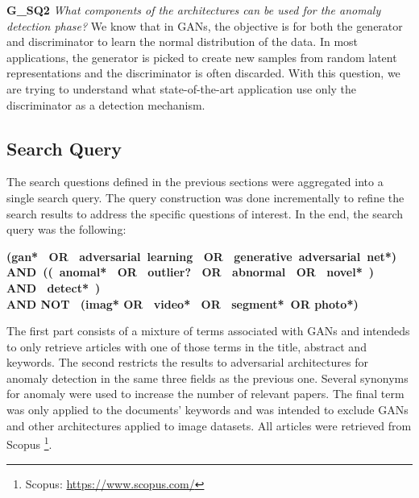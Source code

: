 \noindent\textbf{G\_SQ2} \textit{What components of the architectures can be used for the anomaly detection phase?} We know that in GANs, the objective is for both the generator and discriminator to learn the normal distribution of the data. In most applications, the generator is picked to create new samples from random latent representations and the discriminator is often discarded. With this question, we are trying to understand what state-of-the-art application use only the discriminator as a detection mechanism.

\subsection{Search Query}\label{sec:gan_search_queries}
The search questions defined in the previous sections were aggregated into a single search query. The query construction was done incrementally to refine the search results to address the specific questions of interest. In the end, the search query was the following:
\begin{center}
\textbf{(gan*  OR  adversarial learning  OR  generative adversarial net*) \\ AND (( anomal*  OR  outlier?  OR  abnormal  OR  novel* )  AND  detect* ) \\ AND NOT  (imag* OR  video*  OR  segment* OR photo*)}
\end{center}

The first part consists of a mixture of terms associated with GANs and intendeds to only retrieve articles with one of those terms in the title, abstract and keywords. The second restricts the results to adversarial architectures for anomaly detection in the same three fields as the previous one. Several synonyms for anomaly were used to increase the number of relevant papers. The final term was only applied to the documents' keywords and was intended to exclude GANs and other architectures applied to image datasets. All articles were retrieved from Scopus \footnote{Scopus: \url{https://www.scopus.com/}}.

